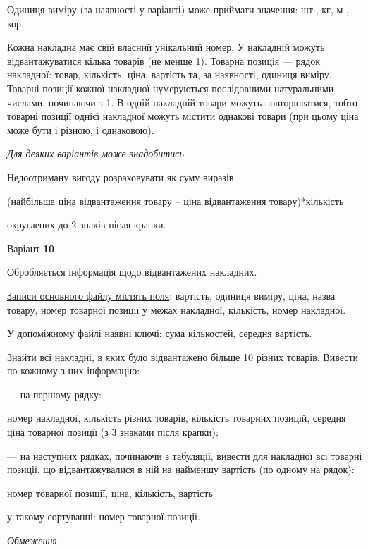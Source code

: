 \documentclass[11pt, ukrainian]{article}
\begin{document}
Одиниця виміру (за наявності у варіанті) може приймати значення: шт., кг, м , кор.

Кожна накладна має свій власний унікальний номер.
У накладній можуть відвантажуватися кілька товарів (не менше 1).
Товарна позиція --- рядок накладної: товар, кількість, ціна, вартість та, за наявності, одиниця виміру.
Товарні позиції кожної накладної нумеруються послідовними натуральними числами, починаючи з 1.
В одній накладній товари можуть повторюватися, 
тобто товарні позиції однієї накладної можуть містити однакові товари 
(при цьому ціна може бути і різною, і однаковою).

\bigskip\textit{Для деяких варіантів може знадобитись}

Недоотриману вигоду розраховувати як суму виразів
{\center (найбільша ціна відвантаження товару – ціна відвантаження товару)*кількість\par}

\bigskip
{\noindent} округлених до 2 знаків після крапки.


\par
\newpage
{\center Варіант  \No \textbf { 10 }\par}
\bigskip
Обробляється інформація щодо відвантажених накладних.

\underline{Записи основного файлу містять поля}: вартість, одиниця виміру, ціна, назва товару, номер товарної позиції у межах накладної, кількість, номер накладної.

\underline{У допоміжному файлі наявні ключі}: сума кількостей, середня вартість.

\underline{Знайти} всі накладні, в яких було відвантажено більше 10 різних товарів. Вивести по кожному з них інформацію:\par
{\noindent}--- на першому рядку:\par
номер накладної, кількість різних товарів, кількість товарних позицій, середня ціна товарної позиції (з 3 знаками після крапки);

{\noindent}--- на наступних рядках, починаючи з табуляції, вивести для накладної всі товарні позиції, що відвантажувалися в ній на найменшу вартість (по одному на рядок):\par
номер товарної позиції, ціна, кількість, вартість

{\noindent}у такому сортуванні: номер товарної позиції.


\bigskip\textit{Обмеження}
\end{document}
